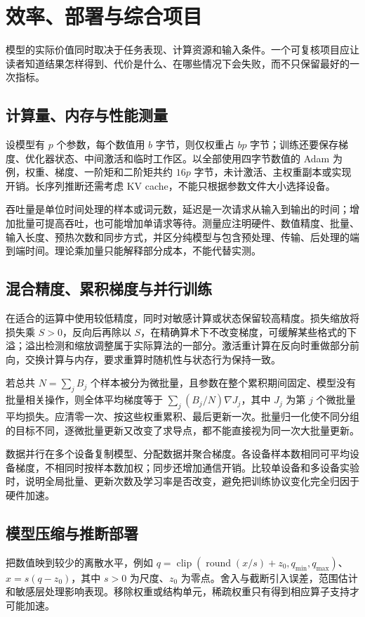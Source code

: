 \documentclass[UTF8,12pt,a4paper,fontset=fandol]{ctexbook}
\begin{document}
\chapter{效率、部署与综合项目}
\label{chap:dl-projects}
模型的实际价值同时取决于任务表现、计算资源和输入条件。一个可复核项目应让读者知道结果怎样得到、代价是什么、在哪些情况下会失败，而不只保留最好的一次指标。

\section{计算量、内存与性能测量}
设模型有 $p$ 个参数，每个数值用 $b$ 字节，则仅权重占 $bp$ 字节；训练还要保存梯度、优化器状态、中间激活和临时工作区。以全部使用四字节数值的 Adam 为例，权重、梯度、一阶矩和二阶矩共约 $16p$ 字节，未计激活、主权重副本或实现开销。长序列推断还需考虑 KV cache，不能只根据参数文件大小选择设备。

吞吐量是单位时间处理的样本或词元数，延迟是一次请求从输入到输出的时间；增加批量可提高吞吐，也可能增加单请求等待。测量应注明硬件、数值精度、批量、输入长度、预热次数和同步方式，并区分纯模型与包含预处理、传输、后处理的端到端时间。理论乘加量只能解释部分成本，不能代替实测。

\section{混合精度、累积梯度与并行训练}
在适合的运算中使用较低精度，同时对敏感计算或状态保留较高精度。损失缩放将损失乘 $S>0$，反向后再除以 $S$，在精确算术下不改变梯度，可缓解某些格式的下溢；溢出检测和缩放调整属于实际算法的一部分。激活重计算在反向时重做部分前向，交换计算与内存，要求重算时随机性与状态行为保持一致。

若总共 $N=\sum_jB_j$ 个样本被分为微批量，且参数在整个累积期间固定、模型没有批量相关操作，则全体平均梯度等于 $\sum_j(B_j/N)\nabla J_j$，其中 $J_j$ 为第 $j$ 个微批量平均损失。应清零一次、按这些权重累积、最后更新一次。批量归一化使不同分组的目标不同，逐微批量更新又改变了求导点，都不能直接视为同一次大批量更新。

数据并行在多个设备复制模型、分配数据并聚合梯度。各设备样本数相同可平均设备梯度，不相同时按样本数加权；同步还增加通信开销。比较单设备和多设备实验时，说明全局批量、更新次数及学习率是否改变，避免把训练协议变化完全归因于硬件加速。

\section{模型压缩与推断部署}
把数值映到较少的离散水平，例如 $q=\operatorname{clip}(\operatorname{round}(x/s)+z_0,q_{\min},q_{\max})$、$\widehat x=s(q-z_0)$，其中 $s>0$ 为尺度、$z_0$ 为零点。舍入与截断引入误差，范围估计和敏感层处理影响表现。移除权重或结构单元，稀疏权重只有得到相应算子支持才可能加速。
\end{document}
